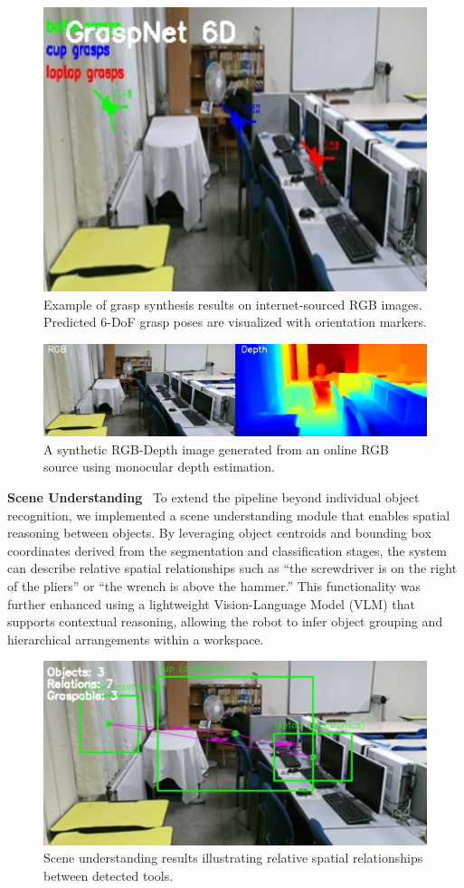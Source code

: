 \documentclass[12pt]{extarticle}
\begin{document}
\begin{figure}[htbp]
\centering
\includegraphics[width=0.5\linewidth]{images/graspnet_img.png}
\caption{Example of grasp synthesis results on internet-sourced RGB images. Predicted 6-DoF grasp poses are visualized with orientation markers.}
\label{fig: grasp_result}
\end{figure}


\begin{figure}[htbp]
\centering
\includegraphics[width=\linewidth]{images/RGB-Dep.png}
\caption{A synthetic RGB-Depth image generated from an online RGB source using monocular depth estimation.}
\label{fig: grasp_result}
\end{figure}


\textbf{Scene Understanding} \
To extend the pipeline beyond individual object recognition, we implemented a scene understanding module that enables spatial reasoning between objects. By leveraging object centroids and bounding box coordinates derived from the segmentation and classification stages, the system can describe relative spatial relationships such as “the screwdriver is on the right of the pliers” or “the wrench is above the hammer.” This functionality was further enhanced using a lightweight Vision-Language Model (VLM) that supports contextual reasoning, allowing the robot to infer object grouping and hierarchical arrangements within a workspace.

\begin{figure}[htbp]
\centering
\includegraphics[width=0.5\linewidth]{images/scene_understanding.png}
\caption{Scene understanding results illustrating relative spatial relationships between detected tools.}
\label{fig: scene_understanding}
\end{figure}
\end{document}

